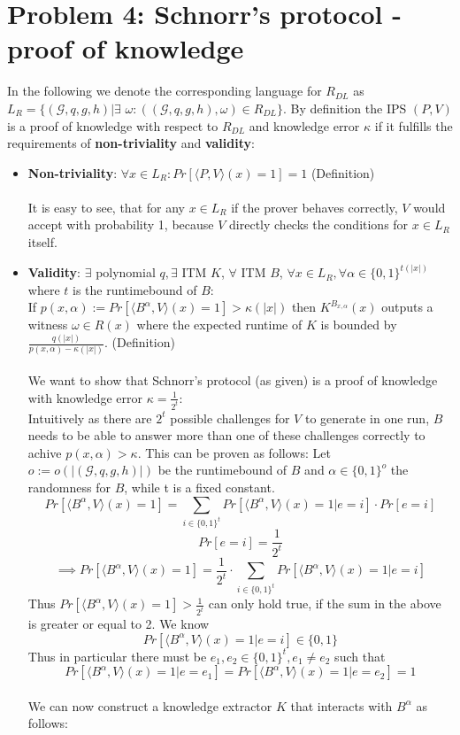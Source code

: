 \documentclass[12pt,pdftex,a4paper]{article}
\begin{document}
\section*{Problem 4: Schnorr’s protocol - proof of knowledge}
In the following we denote the corresponding language for $R_{DL}$ as $L_R = \{(\mathcal{G}, q, g, h)|\exists$ $\omega: ((\mathcal{G}, q, g, h), \omega)\in R_{DL}\}$.
By definition the IPS $(P,V)$ is a proof of knowledge with respect to $R_{DL}$ and knowledge error $\kappa$ if it fulfills the requirements of \textbf{non-triviality} and \textbf{validity}:
\begin{itemize}
\item \textbf{Non-triviality}: $\forall x \in L_R: Pr[\langle P, V \rangle (x) = 1] = 1$ (Definition)
\\~\\
It is easy to see, that for any $x \in L_R$ if the prover behaves correctly, $V$ would accept with probability 1, because $V$ directly checks the conditions for $x\in L_R$ itself.
\item \textbf{Validity}: $\exists$ polynomial $q, \exists$ ITM $K$, $\forall$ ITM $B$, $\forall x\in L_R,\forall\alpha\in\{0,1\}^{t(|x|)}$ where $t$ is the runtimebound of $B$:\\
If $p(x,\alpha) := Pr[\langle B^{\alpha}, V\rangle (x) = 1] > \kappa(|x|)$ then $K^{B_{x,\alpha}}(x)$ outputs a witness $\omega\in R(x)$ where the expected runtime of $K$ is bounded by $\frac{q(|x|)}{p(x, \alpha)-\kappa(|x|)}$. (Definition)
\\~\\
We want to show that Schnorr’s protocol (as given) is a proof of knowledge with knowledge error $\kappa = \frac{1}{2^{t}}$:\\
Intuitively as there are $2^t$ possible challenges for $V$ to generate in one run, $B$ needs to be able to answer more than one of these challenges correctly to achive $p(x,\alpha)>\kappa$. This can be proven as follows: Let $o:=o(|(\mathcal{G}, q, g, h)|)$ be the runtimebound of $B$ and $\alpha\in \{0,1\}^o$ the randomness for $B$, while t is a fixed constant. 
$$Pr[\langle B^{\alpha}, V\rangle (x) = 1] = \sum_{i \in \{0,1\}^t}{Pr[\langle B^{\alpha}, V\rangle (x) = 1|e=i]\cdot Pr[e=i]}$$
$$Pr[e=i] = \frac{1}{2^t}$$
$$\implies Pr[\langle B^{\alpha}, V\rangle (x) = 1] = \frac{1}{2^t} \cdot \sum_{i \in \{0,1\}^t}{Pr[\langle B^{\alpha}, V\rangle (x) = 1|e=i]}$$
Thus $Pr[\langle B^{\alpha}, V\rangle (x) = 1] > \frac{1}{2^t}$ can only hold true, if the sum in the above is greater or equal to 2. We know 
$$Pr[\langle B^{\alpha}, V\rangle (x) = 1|e=i] \in \{0,1\}$$
Thus in particular there must be $e_1, e_2 \in \{0,1\}^t, e_1\neq e_2$ such that 
$$Pr[\langle B^{\alpha}, V\rangle (x) = 1|e=e_1]=Pr[\langle B^{\alpha}, V\rangle (x) = 1|e=e_2]=1$$
\\
We can now construct a knowledge extractor $K$ that interacts with $B^{\alpha}$ as follows:


\end{itemize}
\end{document}
